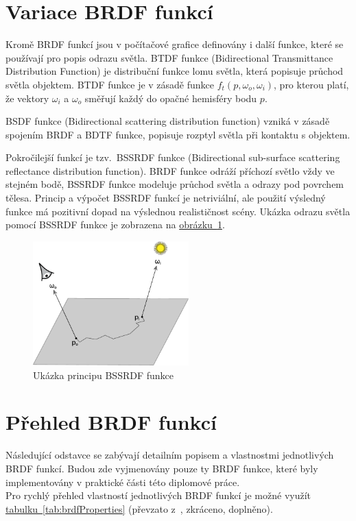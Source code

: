 \documentclass[czech,master]{diploma}
\newcommand{\point}{p}
\newcommand{\btdf}{f_t\left(\point,\omega_{o},\omega_{i}\right)}
\newcommand{\inVec}{\omega_{i}}
\newcommand{\outVec}{\omega_{o}}
\begin{document}
\section{Variace BRDF funkcí}
Kromě BRDF funkcí jsou v počítačové grafice definovány i další funkce, které se používají pro popis odrazu světla. BTDF funkce (Bidirectional Transmittance Distribution Function) je distribuční funkce lomu světla, která popisuje průchod světla objektem. BTDF funkce je v zásadě funkce \(\btdf\), pro kterou platí, že vektory \(\inVec\) a \(\outVec\) směřují každý do opačné hemisféry bodu \(\point\).\par
BSDF funkce (Bidirectional scattering distribution function) vzniká v zásadě spojením BRDF a BDTF funkce, popisuje rozptyl světla při kontaktu s objektem.\par
Pokročilejší funkcí je tzv.\ BSSRDF funkce (Bidirectional sub-surface scattering reflectance distribution function). BRDF funkce odráží příchozí světlo vždy ve stejném bodě, BSSRDF funkce modeluje průchod světla a odrazy pod povrchem tělesa. Princip a výpočet BSSRDF funkcí je netriviální, ale použití výsledný funkce má pozitivní dopad na výslednou realističnost scény. Ukázka odrazu světla pomocí BSSRDF funkce je zobrazena na \hyperref[fig:bssrdf]{obrázku~\ref{fig:bssrdf}}.

\begin{figure}[ht]
  \centering
  \includegraphics[width=6cm]{Figures/BSSRDF.pdf}%
  \caption{Ukázka principu BSSRDF funkce~\cite{PHARR2017313}}
  \label{fig:bssrdf}
\end{figure}

\section{Přehled BRDF funkcí}\label{sec:brdffunctions}
Následující odstavce se zabývají detailním popisem a vlastnostmi jednotlivých BRDF funkcí. Budou zde vyjmenovány pouze ty BRDF funkce, které byly implementovány v praktické části této diplomové práce. \\
Pro rychlý přehled vlastností jednotlivých BRDF funkcí je možné využít \hyperref[tab:brdfProperties]{tabulku~\ref{tab:brdfProperties}} (převzato z~\cite{BRDFOverview}, zkráceno, doplněno).
\end{document}
